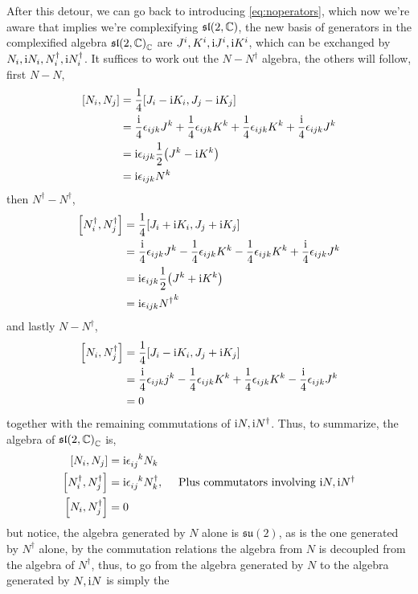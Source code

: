 After this detour, we can go back to introducing \cref{eq:noperators}, which now we're aware that implies we're complexifying $\mathfrak{sl}\qty(2,\mathbb C)$, the new basis of 
generators in the complexified algebra $\mathfrak {sl}\qty(2,\mathbb C)_{\mathbb C}$ are $J^i,K^i,\textnormal{i} J^i,\textnormal{i} K^i$, which can be exchanged by $N_ i, \textnormal{i} N_ i, N^\dagger_i, \textnormal{i} N^\dagger_i$. 
It suffices to work out the $N-N^\dagger$ algebra, the others will follow, first $N-N$,
\begin{align}
    \comm{N_i}{N_j}&=\frac14\comm{J_i-\im K_i}{J_j-\im K_j}\\
    &=\frac\im4\epsilon_{ijk}J^k+\frac14\epsilon_{ijk}K^k+\frac14\epsilon_{ijk}K^k+\frac\im4\epsilon_{ijk}J^k\\
    &=\im\epsilon_{ijk}\frac12\qty(J^k-\im K^k)\\
    &=\im\epsilon_{ijk}N^k
\end{align}
then $N^\dagger-N^\dagger$,
\begin{align}
    \comm{N^\dagger_i}{N^\dagger_j}&=\frac14\comm{J_i+\im K_i}{J_j+\im K_j}\\
    &=\frac\im4\epsilon_{ijk}J^k-\frac14\epsilon_{ijk}K^k-\frac14\epsilon_{ijk}K^k+\frac\im4\epsilon_{ijk}J^k\\
    &=\im\epsilon_{ijk}\frac12\qty(J^k+\im K^k)\\
    &=\im\epsilon_{ijk}{N^\dagger}^k
\end{align}
and lastly $N-N^\dagger$,
\begin{align}
    \comm{N_i}{N^\dagger_j}&=\frac14\comm{J_i-\im K_i}{J_j+\im K_j}\\
    &=\frac\im4\epsilon_{ijk}j^k-\frac14\epsilon_{ijk}K^k+\frac14\epsilon_{ijk}K^k-\frac\im4\epsilon_{ijk}J^k\\
    &=0
\end{align}
together with the remaining commutations of $\textnormal{i} N, \textnormal{i} N^\dagger$. Thus, to summarize, the algebra of $\mathfrak {sl}\qty(2,\mathbb C)_{\mathbb C}$ is,
\begin{align}
    \comm{N_i}{N_j}&=\im\tensor{\epsilon}{_i_j^k}N_k\\
    \comm{N^\dagger_i}{N^\dagger_j}&=\im\tensor{\epsilon}{_i_j^k}N^\dagger_k,\ \ \ \ \textnormal{Plus commutators involving }\im N, \im N^\dagger\\
    \comm{N_i}{N^\dagger_j}&=0
\end{align}
but notice, the algebra generated by $N$ alone is $\mathfrak {su}(2)$, as is the one generated by $N^\dagger $ alone, by the commutation 
relations the algebra from $N$ is decoupled from the algebra of $N^\dagger$, thus, to go from the algebra generated by $N$ to the algebra generated by $N,\textnormal{i} N$ is simply the 
